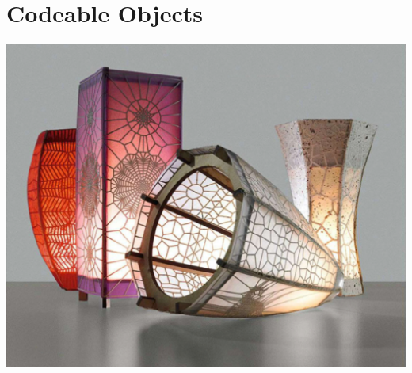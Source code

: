 \chapter{Codeable Objects}

\begin{center}
\includegraphics[width=6.5in]{images/finished_lamps.png}
\end{center}

